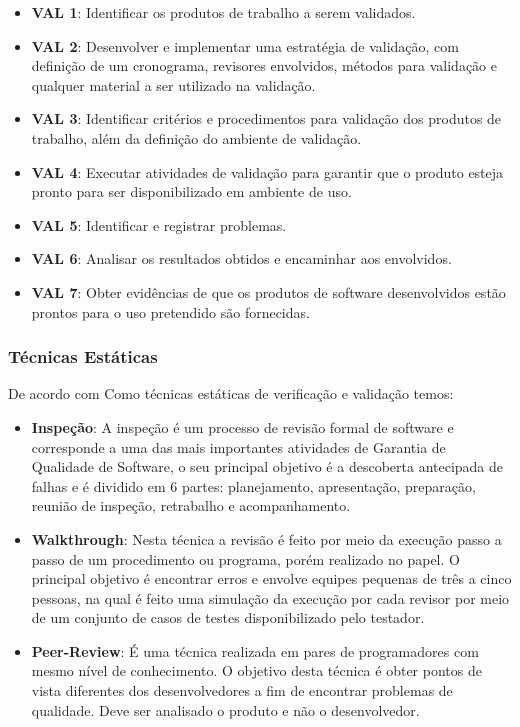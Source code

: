 \begin{itemize}
  \item \textbf{VAL 1}: Identificar os produtos de trabalho a serem validados.
  \item \textbf{VAL 2}: Desenvolver e implementar uma estratégia de validação, com definição de um cronograma,
    revisores envolvidos, métodos para validação e qualquer material a ser utilizado na validação.
  \item \textbf{VAL 3}: Identificar critérios e procedimentos para validação dos produtos de trabalho, além da
    definição do ambiente de validação.
  \item \textbf{VAL 4}: Executar atividades de validação para garantir que o produto esteja pronto para ser
    disponibilizado em ambiente de uso.
  \item \textbf{VAL 5}: Identificar e registrar problemas.
  \item \textbf{VAL 6}: Analisar os resultados obtidos e encaminhar aos envolvidos.
  \item \textbf{VAL 7}: Obter evidências de que os produtos de software desenvolvidos estão prontos para o uso
    pretendido são fornecidas.
\end{itemize}

\subsubsection{Técnicas Estáticas}

De acordo com \cite{myers} Como técnicas estáticas de verificação e validação temos:

\begin{itemize}
  \item \textbf{Inspeção}: A inspeção é um processo de revisão formal de software e corresponde a uma das mais
    importantes atividades de Garantia de Qualidade de Software, o seu principal objetivo é a descoberta antecipada
    de falhas e é dividido em 6 partes: planejamento, apresentação, preparação, reunião de inspeção, retrabalho e
    acompanhamento.
  \item \textbf{Walkthrough}: Nesta técnica a revisão é feito por meio da execução passo a passo de um procedimento ou
    programa, porém realizado no papel. O principal objetivo é encontrar erros e envolve equipes pequenas de três a
    cinco pessoas, na qual é feito uma simulação da execução por cada revisor por meio de um conjunto de casos de testes
    disponibilizado pelo testador.
  \item \textbf{Peer-Review}: É uma técnica realizada em pares de programadores com mesmo nível de conhecimento. O
    objetivo desta técnica é obter pontos de vista diferentes dos desenvolvedores a fim de encontrar problemas de
    qualidade. Deve ser analisado o produto e não o desenvolvedor.
\end{itemize}


